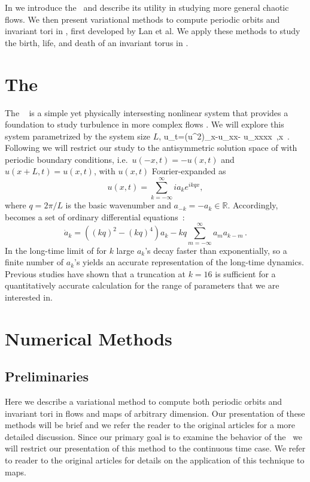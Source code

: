 \documentclass[aip,cha,reprint,
secnumarabic,
nofootinbib, tightenlines,
nobibnotes, showkeys, showpacs,
groupedaddress
]{revtex4-1}
\begin{document}
In  we introduce the \KSe\ and describe its utility in
studying more general chaotic flows.  We then present variational methods
to compute periodic orbits and invariant tori in ,
first developed by Lan et al.  We apply these methods to study the birth,
life, and death of an invariant torus in .

\section{The \KSe}
\label{s:KSSys}
The \KSe\  is a simple yet physically intersesting nonlinear system that provides a foundation to study turbulence in more complex flows .   We will explore this system
parametrized by the system size $L$,
\beq
u_t=(u^2)_x-u_{xx}- u_{xxxx}
    \,,\qquad       x \in [0,L]
\,.
Following  we will restrict our study to the antisymmetric solution space of
 with periodic boundary conditions, i.e.\ $u(-x,t)=-u(x,t)$
and $u(x+L,t)=u(x,t)$,
with $u(x,t)$ Fourier-expanded as
 \begin{equation}
u(x,t)=\sum_{k=-\infty}^{\infty} i a_k e^{ikqx}, \label{eq:uexpan}
\end{equation}
 where $q=2\pi/L$ is the basic wavenumber and
 $a_{-k}=-a_k \in \mathbb{R}$.  Accordingly,  becomes
a set of ordinary differential equations~:
 \begin{equation}
\dot{a}_k=((kq)^2-
    (kq)^4)a_k - kq \sum_{m=-\infty}^{\infty} a_m a_{k-m}
\,.
\label{ksexpan}
\end{equation}
In the long-time limit of  for $k$ large $a_k$'s decay
faster than exponentially, so a finite number of $a_k$'s yields an
accurate representation of the long-time dynamics.  Previous
studies have shown that a truncation at $k=16$ is
sufficient for a quantitatively accurate calculation for the range of parameters that we are interested in.

\section{Numerical Methods} \label{s:Numerics}

\subsection{Preliminaries}
Here we describe a variational method to compute both periodic orbits
 and invariant tori in flows and maps of arbitrary
dimension.  Our presentation of these methods will be brief and we refer
the reader to the original articles for a more detailed discussion. Since
our primary goal is to examine the behavior of the \KSe\ we will restrict
our presentation of this method to the continuous time case.  We refer to
reader to the original articles for details on the application of this
technique to maps.
\end{document}
